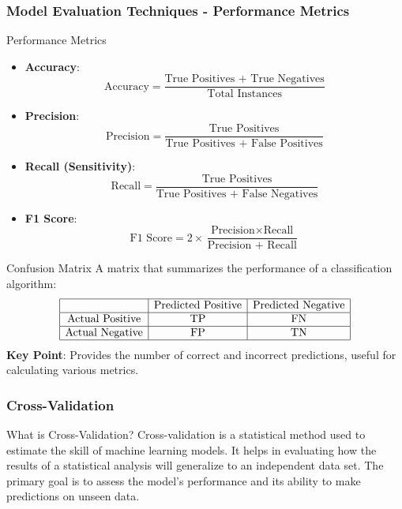 \documentclass{beamer}
\begin{document}
\begin{frame}[fragile]
    \frametitle{Model Evaluation Techniques - Performance Metrics}
    \begin{block}{Performance Metrics}
        \begin{itemize}
            \item \textbf{Accuracy}:
                \[
                \text{Accuracy} = \frac{\text{True Positives + True Negatives}}{\text{Total Instances}}
                \]
            \item \textbf{Precision}:
                \[
                \text{Precision} = \frac{\text{True Positives}}{\text{True Positives + False Positives}}
                \]
            \item \textbf{Recall (Sensitivity)}:
                \[
                \text{Recall} = \frac{\text{True Positives}}{\text{True Positives + False Negatives}}
                \]
            \item \textbf{F1 Score}:
                \[
                \text{F1 Score} = 2 \times \frac{\text{Precision} \times \text{Recall}}{\text{Precision + Recall}}
                \]
        \end{itemize}
    \end{block}
    
    \begin{block}{Confusion Matrix}
        A matrix that summarizes the performance of a classification algorithm:
        \[
        \begin{array}{|c|c|c|}
            \hline
            & \text{Predicted Positive} & \text{Predicted Negative} \\
            \hline
            \text{Actual Positive} & \text{TP} & \text{FN} \\
            \hline
            \text{Actual Negative} & \text{FP} & \text{TN} \\
            \hline
        \end{array}
        \]
        \textbf{Key Point}: Provides the number of correct and incorrect predictions, useful for calculating various metrics.
    \end{block}
\end{frame}

\begin{frame}[fragile]
    \frametitle{Cross-Validation}
    \begin{block}{What is Cross-Validation?}
        Cross-validation is a statistical method used to estimate the skill of machine learning models. It helps in evaluating how the results of a statistical analysis will generalize to an independent data set. The primary goal is to assess the model's performance and its ability to make predictions on unseen data.
    \end{block}
\end{frame}
\end{document}
